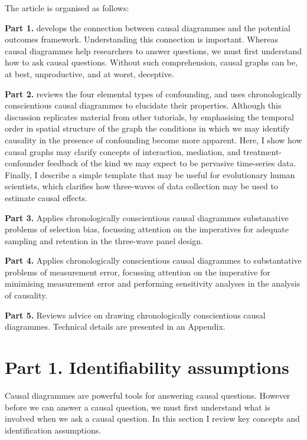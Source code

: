\documentclass[
  singlecolumn]{report}
\begin{document}
The article is organised as follows:

\textbf{Part 1.} develops the connection between causal diagrammes and
the potential outcomes framework. Understanding this connection is
important. Whereas causal diagrammes help researchers to answer
questions, we must first understand how to ask causal questions. Without
such comprehension, causal graphs can be, at best, unproductive, and at
worst, deceptive.

\textbf{Part 2.} reviews the four elemental types of confounding, and
uses chronologically conscientious causal diagrammes to elucidate their
properties. Although this discussion replicates material from other
tutorials, by emphasising the temporal order in spatial structure of the
graph the conditions in which we may identify causality in the presence
of confounding become more apparent. Here, I show how causal graphs may
clarify concepts of interaction, mediation, and treatment-confounder
feedback of the kind we may expect to be pervasive time-series data.
Finally, I describe a simple template that may be useful for
evolutionary human scientists, which clarifies how three-waves of data
collection may be used to estimate causal effects.

\textbf{Part 3.} Applies chronologically conscientious causal diagrammes
substanative problems of selection bias, focussing attention on the
imperatives for adequate sampling and retention in the three-wave panel
design.

\textbf{Part 4.} Applies chronologically conscientious causal diagrammes
to substantative problems of measurement error, focussing attention on
the imperative for minimising measurement error and performing
sensitivity analyses in the analysis of causality.

\textbf{Part 5.} Reviews advice on drawing chronologically conscientious
causal diagrammes. Technical details are presented in an Appendix.

\hypertarget{part-1.-identifiability-assumptions}{%
\section{Part 1. Identifiability
assumptions}\label{part-1.-identifiability-assumptions}}

Causal diagrammes are powerful tools for answering causal questions.
However before we can answer a causal question, we must first understand
what is involved when we ask a causal question. In this section I review
key concepts and identification assumptions.
\end{document}
